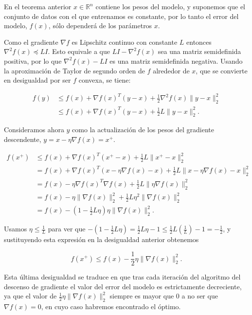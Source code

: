 En el teorema anterior $x \in \mathbb{R}^n$ contiene los pesos del modelo, y suponemos que el conjunto de datos con el que entrenamos es constante, por lo tanto el error del modelo, $f(x)$, sólo dependerá de los parámetros $x$.

Como el gradiente $\nabla f$ es Lipschitz continuo con constante $L$ entonces $\nabla ^2 f(x) \preceq LI$. Esto equivale a que $ \textstyle LI- \nabla^2f(x) $ sea una matriz semidefinida positiva, por lo que $\nabla ^2 f(x) -LI$ es una matriz semidefinida negativa. Usando la aproximación de Taylor de segundo orden de $f$ alrededor de $x$, que se convierte en desigualdad por ser $f$ convexa, se tiene:

\begin{align*}
    f(y) &\leq f(x) + \nabla f(x)^T (y-x) +\frac{1}{2}\nabla^2 f(x) \|y-x\|^2_2  \\
    &\leq f(x) + \nabla f(x)^T(y-x) + \frac{1}{2}L \|y - x \|^2_2.
\end{align*}

Consideramos ahora $y$ como la actualización de los pesos del gradiente descendente, $y=x - \eta \nabla f(x)=x^+$. 


\begin{align*}
    f(x^+) &\leq f(x) + \nabla f(x)^T(x^+-x) + \frac{1}{2}L \|x^+ - x \|^2_2 \\
    &= f(x) + \nabla f(x)^T(x - \eta \nabla f(x) -x) + \frac{1}{2}L \|x - \eta \nabla f(x) - x \|^2_2 \\
    &= f(x) - \eta \nabla f(x)^T \nabla f(x) + \frac{1}{2} L \| \eta \nabla f(x) \|^2_2 \\
    &= f(x) - \eta \| \nabla f(x) \|^2_2 + \frac{1}{2} L \eta^2 \| \nabla f(x) \|^2_2 \\
    &= f(x) - (1- \frac{1}{2}L \eta) \eta \| \nabla f(x) \|^2_2.
\end{align*}

Usamos $\eta \leq \frac{1}{L}$ para ver que $-(1-\frac{1}{2}L \eta)= \frac{1}{2} L \eta - 1 \leq \frac{1}{2} L (\frac{1}{L}) - 1 = -\frac{1}{2}$, y sustituyendo esta expresión en la desigualdad anterior obtenemos 

\begin{equation}\label{eq:gdproof1}
	f(x^+) \leq f(x) - \frac{1}{2} \eta \| \nabla f(x) \|^2_2 .
\end{equation}

Esta última desigualdad se traduce en que tras cada iteración del algoritmo del descenso de gradiente el valor del error del modelo es estrictamente decreciente, ya que el valor de $\frac{1}{2} \eta \| \nabla f(x) \|^2_2$ siempre es mayor que 0 a no ser que $\nabla f(x)=0$, en cuyo caso habremos encontrado el óptimo. 

